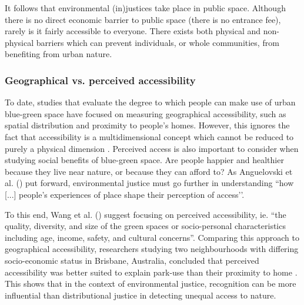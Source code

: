 \documentclass{article}
\begin{document}

It follows that environmental (in)justices take place in public space. Although there is no direct economic barrier to public space (there is no entrance fee), rarely is it fairly accessible to everyone. There exists both physical and non-physical barriers which can prevent individuals, or whole communities, from benefiting from urban nature.

\subsubsection{Geographical vs. perceived accessibility}

To date, studies that evaluate the degree to which people can make use of urban blue-green space have focused on measuring geographical accessibility, such as spatial distribution and proximity to people’s homes. %
However, this ignores the fact that accessibility is a multidimensional concept which cannot be reduced to purely a physical dimension \parencite{wang2015physical}. Perceived access is also important to consider when studying social benefits of blue-green space. Are people happier and healthier because they live near nature, or because they can afford to?
As Anguelovski et al. (\citeyear{anguelovski2020expanding}) put forward, environmental justice must go further in understanding ``how [...] people’s experiences of place shape their perception of access’’.

To this end, Wang et al. (\citeyear{wang2015physical}) suggest focusing on perceived accessibility, ie. ``the quality, diversity, and size of the green spaces or socio-personal characteristics including age, income, safety, and cultural concerns''. Comparing this approach to geographical accessibility, researchers studying two neighbourhoods with differing socio-economic status in Brisbane, Australia, concluded that perceived accessibility was better suited to explain park-use than their proximity to home \parencite{wang2015comparison}.
This shows that in the context of environmental justice, recognition can be more influential than distributional justice in detecting unequal access to nature. 
\end{document}
